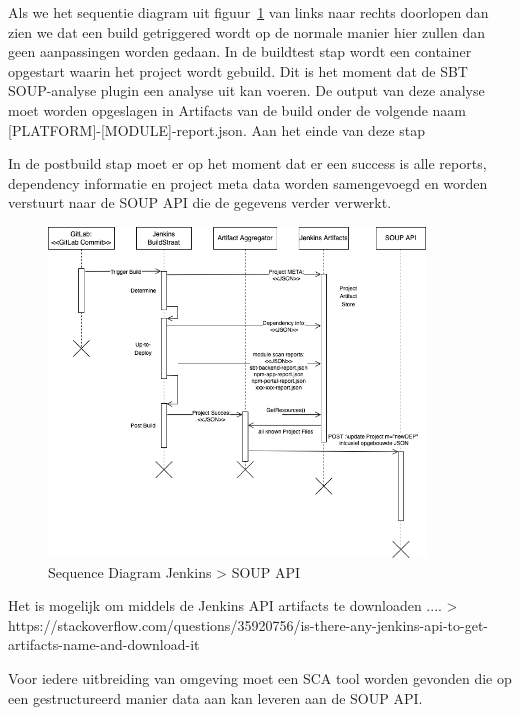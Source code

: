 Als we het sequentie diagram uit figuur~\ref{fig:UML-JenkinsIntegratie} van links naar rechts doorlopen dan zien we dat een build getriggered wordt op de normale manier hier zullen dan geen aanpassingen worden gedaan.
In de buildtest stap wordt een container opgestart waarin het project wordt gebuild. Dit is het moment dat de SBT SOUP-analyse plugin een analyse uit kan voeren. De output van deze analyse moet worden opgeslagen in Artifacts van de build onder de volgende naam [PLATFORM]-[MODULE]-report.json. Aan het einde van deze stap

In de postbuild stap moet er op het moment dat er een success is alle reports, dependency informatie en project meta data worden samengevoegd en worden verstuurt naar de SOUP API die de gegevens verder verwerkt.


\begin{figure}
    \myfloatalign
    \includegraphics[width=10cm]{gfx/UMLJenkinsIntegratie}
    \caption{Sequence Diagram Jenkins > SOUP API}
    \label{fig:UML-JenkinsIntegratie}
\end{figure}

Het is mogelijk om middels de Jenkins API artifacts te downloaden .... > https://stackoverflow.com/questions/35920756/is-there-any-jenkins-api-to-get-artifacts-name-and-download-it



Voor iedere uitbreiding van omgeving moet een SCA tool worden gevonden die op een gestructureerd manier data aan kan leveren aan de SOUP API.


%


